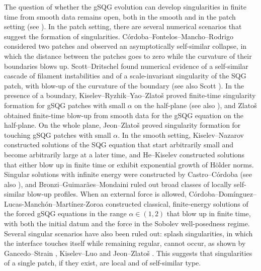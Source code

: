 \documentclass[11pt]{amsart}
\theoremstyle{definition}
\theoremstyle{remark}
\numberwithin{equation}{section}
\begin{document}
The question of whether the gSQG evolution can develop singularities in finite time from smooth data remains open, both in the smooth and in the patch setting (see \cite{Kiselev:open-problems}). In the patch setting, there are several numerical scenarios that suggest the formation of singularities. C\'ordoba--Fontelos--Mancho--Rodrigo \cite{Cordoba-Fontelos-Mancho-Rodrigo:evidence-singularities-contour-dynamics} considered two patches and observed an asymptotically self-similar collapse, in which the distance between the patches goes to zero while the curvature of their boundaries blows up. Scott--Dritschel \cite{Scott-Dritschel:self-similar-sqg,Scott-Dritschel:self-similar-sqg-patch} found numerical evidence of a self-similar cascade of filament instabilities and of a scale-invariant singularity of the SQG patch, with blow-up of the curvature of the boundary (see also Scott \cite{Scott:scenario-singularity-quasigeostrophic}). In the presence of a boundary, Kiselev--Ryzhik--Yao--Zlato\v{s} \cite{Kiselev-Ryzhik-Yao-Zlatos:singularity-alpha-patch-boundary} proved finite-time singularity formation for gSQG patches with small $\alpha$ on the half-plane (see also \cite{Kiselev-Yao-Zlatos:local-regularity-sqg-patch-boundary,Gancedo-Patel:local-existence-blowup-gsqg,Miao-Tan-Xue-Xue:singularity-generalized-sqg-patches-halfplane}), and Zlato\v{s} \cite{Zlatos:local-regularity-singularity-gsqg-halfplane} obtained finite-time blow-up from smooth data for the gSQG equation on the half-plane. On the whole plane, Jeon--Zlato\v{s} \cite{Jeon-Zlatos:touching-gsqg-patches} proved singularity formation for touching gSQG patches with small $\alpha$. In the smooth setting, Kiselev--Nazarov \cite{Kiselev-Nazarov:simple-energy-pump-sqg} constructed solutions of the SQG equation that start arbitrarily small and become arbitrarily large at a later time, and He--Kiselev \cite{He-Kiselev:small-scale-creation-sqg} constructed solutions that either blow up in finite time or exhibit exponential growth of H\"older norms. Singular solutions with infinite energy were constructed by Castro--C\'ordoba \cite{Castro-Cordoba:infinite-energy-sqg} (see also \cite{Hou-Qin-Sire-Wu:self-similar-blowup-1d-gsqg}), and Bronzi--Guimar\~aes--Mondaini \cite{Bronzi-Guimaraes-Mondaini:locally-self-similar-blowup-gsqg} ruled out broad classes of locally self-similar blow-up profiles. When an external force is allowed, C\'ordoba--Dom\'inguez--Lucas-Manch\'on--Mart\'inez-Zoroa \cite{Cordoba-Dominguez-LucasManchon-MartinezZoroa:blowup-forced-gsqg} constructed classical, finite-energy solutions of the forced gSQG equations in the range $\alpha \in (1,2)$ that blow up in finite time, with both the initial datum and the force in the Sobolev well-posedness regime. Several singular scenarios have also been ruled out: splash singularities, in which the interface touches itself while remaining regular, cannot occur, as shown by Gancedo--Strain \cite{Gancedo-Strain:absence-splash-muskat-SQG}, Kiselev--Luo \cite{Kiselev-Luo:nonexistence-splash-sqg} and Jeon--Zlato\v{s} \cite{Jeon-Zlatos:no-splash-gsqg}. This suggests that singularities of a single patch, if they exist, are local and of self-similar type.
\end{document}
